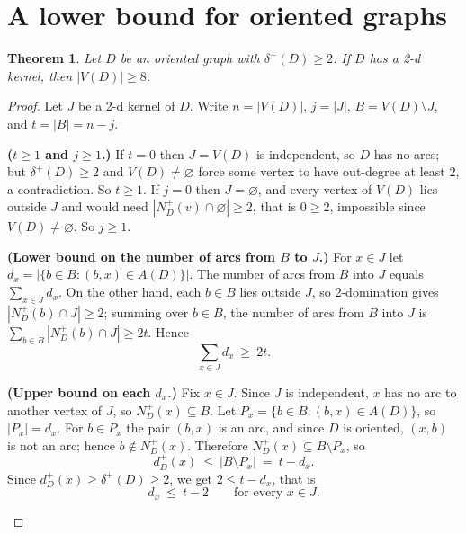 \documentclass[11pt]{article}
\numberwithin{equation}{section}
\theoremstyle{plain}
\newtheorem{theorem}{Theorem}[section]
\newcommand{\V}{V}
\newcommand{\A}{A}
\newcommand{\Np}{N^{+}}
\newcommand{\dip}{d^{+}}
\newcommand{\dmin}{\delta^{+}}
\begin{document}
\section{A lower bound for oriented graphs}
\label{sec:oriented}

\begin{theorem}\label{thm:oriented}
Let $D$ be an oriented graph with $\dmin(D)\ge 2$. If $D$ has a 2-d kernel, then
$|\V(D)|\ge 8$.
\end{theorem}

\begin{proof}
Let $J$ be a 2-d kernel of $D$. Write $n=|\V(D)|$, $j=|J|$, $B=\V(D)\setminus J$, and
$t=|B|=n-j$.

\begin{steps}
\item\textbf{($t\ge 1$ and $j\ge 1$.)}
If $t=0$ then $J=\V(D)$ is independent, so $D$ has no arcs; but $\dmin(D)\ge 2$ and
$\V(D)\neq\varnothing$ force some vertex to have out-degree at least $2$, a
contradiction. So $t\ge 1$. If $j=0$ then $J=\varnothing$, and every vertex of $\V(D)$
lies outside $J$ and would need $|\Np_D(v)\cap\varnothing|\ge 2$, that is $0\ge 2$,
impossible since $\V(D)\neq\varnothing$. So $j\ge 1$.

\item\textbf{(Lower bound on the number of arcs from $B$ to $J$.)}
For $x\in J$ let $d_x=|\{b\in B:(b,x)\in\A(D)\}|$. The number of arcs from $B$ into $J$
equals $\sum_{x\in J}d_x$. On the other hand, each $b\in B$ lies outside $J$, so
2-domination gives $|\Np_D(b)\cap J|\ge 2$; summing over $b\in B$, the number of arcs
from $B$ into $J$ is $\sum_{b\in B}|\Np_D(b)\cap J|\ge 2t$. Hence
\begin{equation}\label{eq:lower}
  \sum_{x\in J}d_x\ \ge\ 2t .
\end{equation}

\item\textbf{(Upper bound on each $d_x$.)}
Fix $x\in J$. Since $J$ is independent, $x$ has no arc to another vertex of $J$, so
$\Np_D(x)\subseteq B$. Let $P_x=\{b\in B:(b,x)\in\A(D)\}$, so $|P_x|=d_x$. For $b\in
P_x$ the pair $(b,x)$ is an arc, and since $D$ is oriented, $(x,b)$ is not an arc; hence
$b\notin\Np_D(x)$. Therefore $\Np_D(x)\subseteq B\setminus P_x$, so
\[
  \dip_D(x)\ \le\ |B\setminus P_x|\ =\ t-d_x .
\]
Since $\dip_D(x)\ge\dmin(D)\ge 2$, we get $2\le t-d_x$, that is
\begin{equation}\label{eq:upper}
  d_x\ \le\ t-2 \qquad\text{for every } x\in J .
\end{equation}


\end{steps}
\end{proof}
\end{document}
